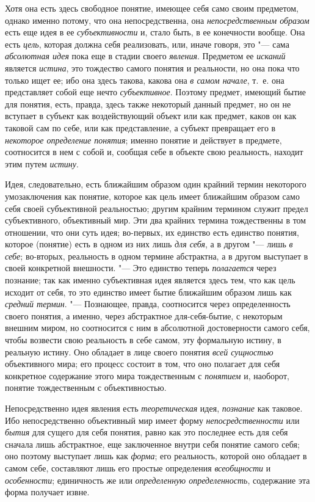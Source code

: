 Хотя она есть здесь свободное понятие, имеющее себя само своим
предметом, однако именно потому, что она непосредственна, она
{\em непосредственным образом}
есть еще идея в ее
{\em субъективности} и,
стало быть, в ее конечности вообще. Она есть
{\em цель}, которая
должна себя реализовать, или, иначе говоря, это "--- сама
{\em абсолютная идея}
пока еще в стадии своего
{\em явления}. Предметом
ее {\em исканий} является
{\em истина}, это
тождество самого понятия и реальности, но она пока что только ищет ее; ибо
она здесь такова, какова она {\em в
самом начале}, т.~е. она представляет собой еще нечто
{\em субъективное}.
Поэтому предмет, имеющий бытие для понятия, есть, правда,
здесь также некоторый данный предмет, но он не вступает в субъект как
воздействующий объект или как предмет, каков он как таковой сам по себе,
или как представление, а субъект превращает его в
{\em некоторое определение понятия};
именно понятие и действует в предмете, соотносится в нем с
собой и, сообщая себе в объекте свою реальность, находит этим путем
{\em истину}.

Идея, следовательно, есть ближайшим образом один крайний
термин некоторого умозаключения как понятие, которое как цель имеет
ближайшим образом само себя своей субъективной реальностью; другим крайним
термином служит предел субъективного, объективный мир. Эти два крайних
термина тождественны в том отношении, что они суть идея; во-первых, их
единство есть единство понятия, которое (понятие) есть в одном из них лишь
{\em для себя}, а в
другом "--- лишь {\em в
себе}; во-вторых, реальность в одном термине абстрактна, а в
другом выступает в своей конкретной внешности. "--- Это
единство теперь {\em полагается}
через познание; так как именно субъективная идея является
здесь тем, что как цель исходит от себя, то это единство имеет бытие
ближайшим образом лишь как {\em средний
термин}. "--- Познающее, правда, соотносится через
определенность своего понятия, а именно, через абстрактное
для-себя-бытие, с некоторым внешним миром, но соотносится с
ним в абсолютной достоверности самого себя, чтобы возвести свою реальность
в себе самом, эту формальную истину, в реальную истину. Оно обладает в лице
своего понятия {\em всей сущностью}
объективного мира; его процесс состоит в том, что оно
полагает для себя конкретное содержание этого мира тождественным с
{\em понятием} и,
наоборот, понятие тождественным с объективностью.

Непосредственно идея явления есть
{\em теоретическая} идея,
{\em познание} как
таковое. Ибо непосредственно объективный мир имеет форму
{\em непосредственности}
или {\em бытия}
для сущего для себя понятия, равно как это последнее есть для
себя сначала лишь абстрактное, еще заключенное внутри себя понятие самого
себя; оно поэтому выступает лишь как
{\em форма}; его
реальность, которой оно обладает в самом себе, составляют лишь его простые
определения {\em всеобщности}
и {\em особенности};
единичность же или
{\em определенную определенность},
содержание эта форма получает извне.

